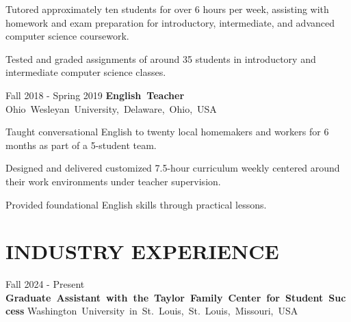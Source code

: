 \documentclass[10pt, letterpaper]{article}
\begin{document}
\vspace{\highlightSpacing}
\begin{onecolentry}
    \begin{highlights}
        \item Tutored approximately ten students for over 6 hours per week, assisting with homework and exam preparation for introductory, intermediate, and advanced computer science coursework.
        \item Tested and graded assignments of around 35 students in introductory and intermediate computer science classes.
    \end{highlights}
\end{onecolentry}

\vspace{\entrySpacing}\begin{twocolentry}{Fall 2018 - Spring 2019}
    \mbox{\textbf{English Teacher}}
    \kern {}
    \AND
    \kern {}
    \mbox{Ohio Wesleyan University, Delaware, Ohio, USA}
\end{twocolentry}

\vspace{\highlightSpacing}
\begin{onecolentry}
    \begin{highlights}
        \item Taught conversational English to twenty local homemakers and workers for 6 months as part of a 5-student team.
        \item Designed and delivered customized 7.5-hour curriculum weekly centered around their work environments under teacher supervision.
        \item Provided foundational English skills through practical lessons.
    \end{highlights}
\end{onecolentry}

\section{INDUSTRY EXPERIENCE}

\begin{twocolentry}{Fall 2024 - Present}
    \mbox{\textbf{Graduate Assistant with the Taylor Family Center for Student Success}}
    \kern {}
    \AND
    \kern {}
    \mbox{Washington University in St. Louis, St. Louis, Missouri, USA}
\end{twocolentry}
\end{document}
